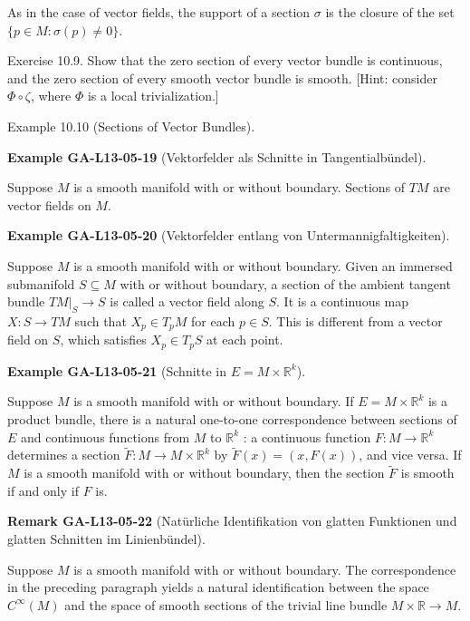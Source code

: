 \documentclass[10pt, letterpaper]{article}
\newcommand{\CustomHeading}[3]{%
  \par\medskip\noindent%
  \textbf{#1 #2} \textnormal{(#3)}.\enskip%
}
\newenvironment{REM}[2]{\begin{unitbox}\CustomHeading{Remark}{#1}{#2}}{\end{unitbox}}
\newenvironment{EXA}[2]{\begin{unitbox}\CustomHeading{Example}{#1}{#2}}{\end{unitbox}}
\begin{document}
As in the case of vector fields, the support of a section $\sigma$ is the closure of the set $\{p \in M: \sigma(p) \neq 0\}$.

Exercise 10.9. Show that the zero section of every vector bundle is continuous, and the zero section of every smooth vector bundle is smooth. [Hint: consider $\Phi \circ \zeta$, where $\Phi$ is a local trivialization.]


Example 10.10 (Sections of Vector Bundles). 

\begin{EXA}{GA-L13-05-19}{Vektorfelder als Schnitte in Tangentialbündel}
Suppose $M$ is a smooth manifold with or without boundary. Sections of $T M$ are vector fields on $M$.
\end{EXA}


\begin{EXA}{GA-L13-05-20}{Vektorfelder entlang von Untermannigfaltigkeiten}
Suppose $M$ is a smooth manifold with or without boundary. Given an immersed submanifold $S \subseteq M$ with or without boundary, a section of the ambient tangent bundle $\left.T M\right|_{S} \rightarrow S$ is called a vector field along $S$. It is a continuous map $X: S \rightarrow T M$ such that $X_{p} \in T_{p} M$ for each $p \in S$. This is different from a vector field on $S$, which satisfies $X_{p} \in T_{p} S$ at each point.
\end{EXA}


\begin{EXA}{GA-L13-05-21}{Schnitte in $E=M \times \mathbb{R}^{k}$}
Suppose $M$ is a smooth manifold with or without boundary. If $E=M \times \mathbb{R}^{k}$ is a product bundle, there is a natural one-to-one correspondence between sections of $E$ and continuous functions from $M$ to $\mathbb{R}^{k}$ : a continuous function $F: M \rightarrow \mathbb{R}^{k}$ determines a section $\widetilde{F}: M \rightarrow M \times \mathbb{R}^{k}$ by $\widetilde{F}(x)=(x, F(x))$, and vice versa. If $M$ is a smooth manifold with or without boundary, then the section $\widetilde{F}$ is smooth if and only if $F$ is.
\end{EXA}


\begin{REM}{GA-L13-05-22}{Natürliche Identifikation von glatten Funktionen und glatten Schnitten im Linienbündel}
Suppose $M$ is a smooth manifold with or without boundary. The correspondence in the preceding paragraph yields a natural identification between the space $C^{\infty}(M)$ and the space of smooth sections of the trivial line bundle $M \times \mathbb{R} \rightarrow M$.
\end{REM}
\end{document}
